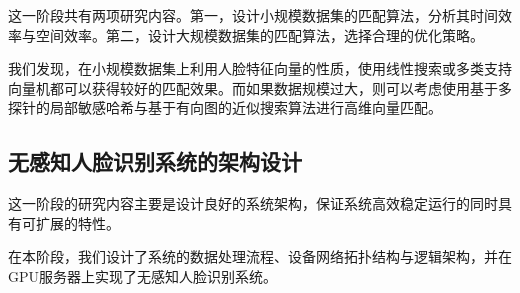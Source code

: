 这一阶段共有两项研究内容。第一，设计小规模数据集的匹配算法，分析其时间效率与空间效率。第二，设计大规模数据集的匹配算法，选择合理的优化策略。

我们发现，在小规模数据集上利用人脸特征向量的性质，使用线性搜索或多类支持向量机都可以获得较好的匹配效果。而如果数据规模过大，则可以考虑使用基于多探针的局部敏感哈希与基于有向图的近似搜索算法进行高维向量匹配。

\subsection{无感知人脸识别系统的架构设计}

这一阶段的研究内容主要是设计良好的系统架构，保证系统高效稳定运行的同时具有可扩展的特性。

在本阶段，我们设计了系统的数据处理流程、设备网络拓扑结构与逻辑架构，并在GPU服务器上实现了无感知人脸识别系统。
